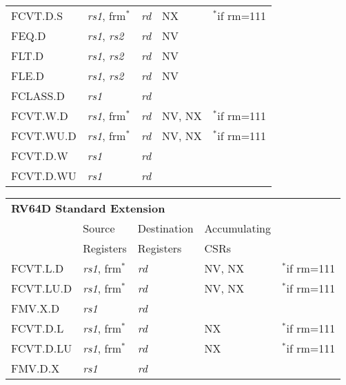 \begin{tabular}{p{3cm}|p{3cm}|p{2cm}|p{4cm}|p{4cm}}
   FCVT.D.S & {\em rs1}, frm$^*$ & {\em rd} & NX & $^*$if rm=111  \\
   \cline{2-4}
   FEQ.D & {\em rs1}, {\em rs2} & {\em rd} & NV &   \\
   \cline{2-4}
   FLT.D & {\em rs1}, {\em rs2} & {\em rd} & NV &   \\
   \cline{2-4}
   FLE.D & {\em rs1}, {\em rs2} & {\em rd} & NV &   \\
   \cline{2-4}
   FCLASS.D & {\em rs1} & {\em rd} &   & \\
   \cline{2-4}
   FCVT.W.D & {\em rs1}, frm$^*$ & {\em rd} & NV, NX & $^*$if rm=111  \\
   \cline{2-4}
   FCVT.WU.D & {\em rs1}, frm$^*$ & {\em rd} & NV, NX & $^*$if rm=111  \\
   \cline{2-4}
   FCVT.D.W & {\em rs1} & {\em rd} &  & \\
   \cline{2-4}
   FCVT.D.WU & {\em rs1} & {\em rd} &  & \\
   \cline{2-4}
\end{tabular}

\begin{tabular}{p{3cm}|p{3cm}|p{2cm}|p{4cm}|p{4cm}}
  \multicolumn{4}{l}{\bf RV64D Standard Extension} \\
  \cline{2-4}
   & Source    & Destination & Accumulating \\
   & Registers & Registers   & CSRs \\
  \cline{2-4}
   FCVT.L.D & {\em rs1}, frm$^*$ & {\em rd} & NV, NX & $^*$if rm=111  \\
   \cline{2-4}
   FCVT.LU.D & {\em rs1}, frm$^*$ & {\em rd} & NV, NX & $^*$if rm=111  \\
   \cline{2-4}
   FMV.X.D & {\em rs1} & {\em rd} &   & \\
   \cline{2-4}
   FCVT.D.L & {\em rs1}, frm$^*$ & {\em rd} & NX & $^*$if rm=111  \\
   \cline{2-4}
   FCVT.D.LU & {\em rs1}, frm$^*$ & {\em rd} & NX & $^*$if rm=111  \\
   \cline{2-4}
   FMV.D.X & {\em rs1} & {\em rd} &   & \\
   \cline{2-4}
\end{tabular}
